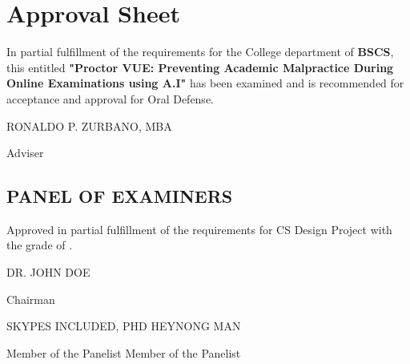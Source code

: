 \section*{\centering Approval Sheet}

In partial fulfillment of the requirements for the College department of \textbf{BSCS}, this entitled \textbf{"Proctor VUE: Preventing Academic Malpractice During Online Examinations using A.I"} has been examined and is recommended for acceptance and approval for Oral Defense.

\vspace{2em}

\begin{flushright}
    \uppercase{Ronaldo P. Zurbano, MBA}

    Adviser
\end{flushright}

\vspace{2em}

\subsection*{\centering PANEL OF EXAMINERS}

Approved in partial fulfillment of the requirements for CS Design Project with the grade of \makebox[1.0in]{\hrulefill}.

\vspace{2em}

\begin{center}
    \uppercase{Dr. John Doe}

    Chairman
\end{center}

\vspace{2em}

\noindent \uppercase{Skypes Included, PhD} \hfill \uppercase{Heynong Man}

\noindent Member of the Panelist \hfill Member of the Panelist
